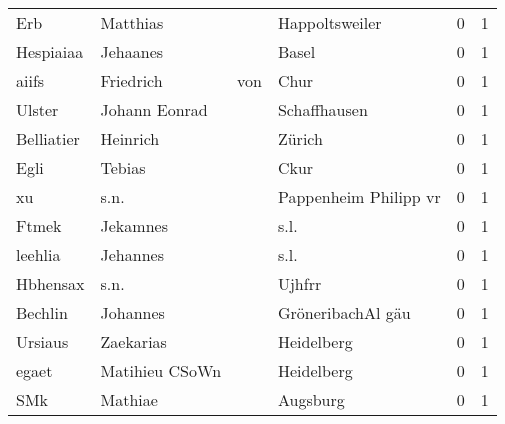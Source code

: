 \begin{center}
\begin{tiny}
\begin{longtabu}{llllrr}
                      Erb &                           Matthias &             &                              Happoltsweiler &          0 &         1 \\
                Hespiaiaa &                           Jehaanes &             &                                       Basel &          0 &         1 \\
                    aiifs &                          Friedrich &         von &                                        Chur &          0 &         1 \\
                   Ulster &                      Johann Eonrad &             &                                Schaffhausen &          0 &         1 \\
               Belliatier &                           Heinrich &             &                                      Zürich &          0 &         1 \\
                     Egli &                             Tebias &             &                                        Ckur &          0 &         1 \\
                       xu &                               s.n. &             &                       Pappenheim Philipp vr &          0 &         1 \\
                    Ftmek &                           Jekamnes &             &                                        s.l. &          0 &         1 \\
                  leehlia &                           Jehannes &             &                                        s.l. &          0 &         1 \\
                 Hbhensax &                               s.n. &             &                                      Ujhfrr &          0 &         1 \\
                  Bechlin &                           Johannes &             &                           GröneribachAl gäu &          0 &         1 \\
                  Ursiaus &                          Zaekarias &             &                                  Heidelberg &          0 &         1 \\
                    egaet &                     Matihieu CSoWn &             &                                  Heidelberg &          0 &         1 \\
                      SMk &                            Mathiae &             &                                    Augsburg &          0 &         1 \\

\end{longtabu}
\end{tiny}
\end{center}

